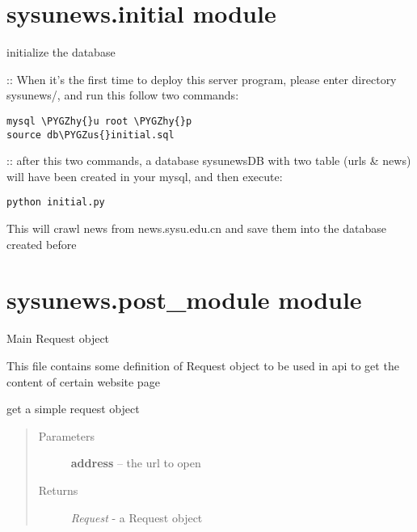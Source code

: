 \documentclass[letterpaper,10pt,english]{sphinxmanual}
\def\PYGZus{\char`\_}
\def\PYGZhy{\char`\-}
\begin{document}
\section{sysunews.initial module}
\label{sysunews:sysunews-initial-module}\label{sysunews:module-sysunews.initial}
initialize the database

::
When it's the first time to deploy this server program, please enter directory sysunews/,
and run this follow two commands:

\begin{Verbatim}[commandchars=\\\{\}]
mysql \PYGZhy{}u root \PYGZhy{}p
source db\PYGZus{}initial.sql
\end{Verbatim}

::
after this two commands, a database sysunewsDB with two table (urls \& news) will have been created in your mysql, and then execute:

\begin{Verbatim}[commandchars=\\\{\}]
python initial.py
\end{Verbatim}

This will crawl news from news.sysu.edu.cn and save them into the database created before


\section{sysunews.post\_module module}
\label{sysunews:module-sysunews.post_module}\label{sysunews:sysunews-post-module-module}
Main Request object

This file contains some definition of Request object to be used in api to get the content of certain website page

\begin{fulllineitems}
\label{sysunews:sysunews.post_module.req_easy_req}
get a simple request object
\begin{quote}\begin{description}
\item[{Parameters}] \leavevmode
\textbf{address} -- the url to open

\item[{Returns}] \leavevmode
\emph{Request} - a Request object

\end{description}\end{quote}

\end{fulllineitems}
\end{document}
